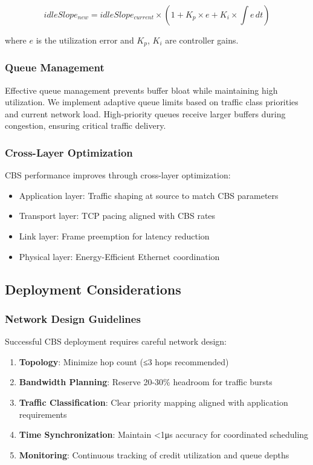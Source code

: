 \documentclass[10pt, journal, compsoc]{IEEEtran}
\begin{document}
\begin{equation}
idleSlope_{new} = idleSlope_{current} \times \left(1 + K_p \times e + K_i \times \int e \, dt\right)
\end{equation}

where $e$ is the utilization error and $K_p$, $K_i$ are controller gains.

\subsubsection{Queue Management}

Effective queue management prevents buffer bloat while maintaining high utilization. We implement adaptive queue limits based on traffic class priorities and current network load. High-priority queues receive larger buffers during congestion, ensuring critical traffic delivery.

\subsubsection{Cross-Layer Optimization}

CBS performance improves through cross-layer optimization:
\begin{itemize}
    \item Application layer: Traffic shaping at source to match CBS parameters
    \item Transport layer: TCP pacing aligned with CBS rates
    \item Link layer: Frame preemption for latency reduction
    \item Physical layer: Energy-Efficient Ethernet coordination
\end{itemize}

\subsection{Deployment Considerations}

\subsubsection{Network Design Guidelines}

Successful CBS deployment requires careful network design:

\begin{enumerate}
    \item \textbf{Topology}: Minimize hop count (≤3 hops recommended)
    \item \textbf{Bandwidth Planning}: Reserve 20-30\% headroom for traffic bursts
    \item \textbf{Traffic Classification}: Clear priority mapping aligned with application requirements
    \item \textbf{Time Synchronization}: Maintain <1μs accuracy for coordinated scheduling
    \item \textbf{Monitoring}: Continuous tracking of credit utilization and queue depths
\end{enumerate}
\end{document}
